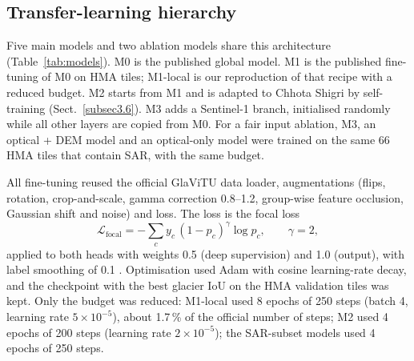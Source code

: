 \documentclass[pdflatex,sn-mathphys-num]{sn-jnl}%
\theoremstyle{thmstyleone}%
\theoremstyle{thmstyletwo}%
\theoremstyle{thmstylethree}%
\begin{document}
\subsection{Transfer-learning hierarchy}\label{subsec3.4}

Five main models and two ablation models share this architecture (Table~\ref{tab:models}). M0 is the published global model. M1 is the published fine-tuning of M0 on HMA tiles; M1-local is our reproduction of that recipe with a reduced budget. M2 starts from M1 and is adapted to Chhota Shigri by self-training (Sect.~\ref{subsec3.6}). M3 adds a Sentinel-1 branch, initialised randomly while all other layers are copied from M0. For a fair input ablation, M3, an optical + DEM model and an optical-only model were trained on the same 66 HMA tiles that contain SAR, with the same budget.

All fine-tuning reused the official GlaViTU data loader, augmentations (flips, rotation, crop-and-scale, gamma correction 0.8--1.2, group-wise feature occlusion, Gaussian shift and noise) and loss. The loss is the focal loss \cite{lin2017}
\begin{equation}
\mathcal{L}_\mathrm{focal} = -\sum_{c} y_c\,(1-p_c)^{\gamma}\log p_c, \qquad \gamma = 2,\label{eq:focal}
\end{equation}
applied to both heads with weights 0.5 (deep supervision) and 1.0 (output), with label smoothing of 0.1 \cite{szegedy2016}. Optimisation used Adam with cosine learning-rate decay, and the checkpoint with the best glacier IoU on the HMA validation tiles was kept. Only the budget was reduced: M1-local used 8 epochs of 250 steps (batch 4, learning rate $5\times10^{-5}$), about 1.7\,\% of the official number of steps; M2 used 4 epochs of 200 steps (learning rate $2\times10^{-5}$); the SAR-subset models used 4 epochs of 250 steps.
\end{document}
